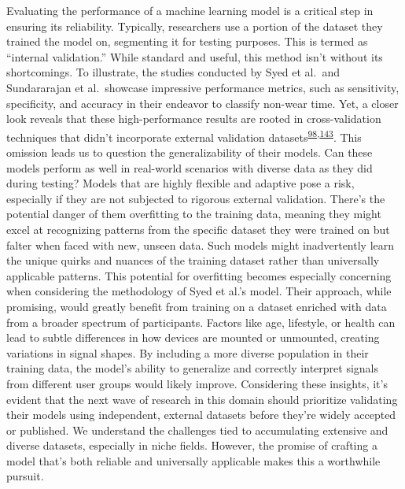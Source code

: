 \documentclass[
  10pt,
]{scrbook}
\begin{document}
Evaluating the performance of a machine learning model is a critical
step in ensuring its reliability. Typically, researchers use a portion
of the dataset they trained the model on, segmenting it for testing
purposes. This is termed as ``internal validation.'' While standard and
useful, this method isn't without its shortcomings. To illustrate, the
studies conducted by Syed et al.~and Sundararajan et al.~showcase
impressive performance metrics, such as sensitivity, specificity, and
accuracy in their endeavor to classify non-wear time. Yet, a closer look
reveals that these high-performance results are rooted in
cross-validation techniques that didn't incorporate external validation
datasets\textsuperscript{\protect\hyperlink{ref-sundararajan_sleep_2021}{98},\protect\hyperlink{ref-syed_evaluating_2020}{143}}.
This omission leads us to question the generalizability of their models.
Can these models perform as well in real-world scenarios with diverse
data as they did during testing? Models that are highly flexible and
adaptive pose a risk, especially if they are not subjected to rigorous
external validation. There's the potential danger of them overfitting to
the training data, meaning they might excel at recognizing patterns from
the specific dataset they were trained on but falter when faced with
new, unseen data. Such models might inadvertently learn the unique
quirks and nuances of the training dataset rather than universally
applicable patterns. This potential for overfitting becomes especially
concerning when considering the methodology of Syed et al.'s model.
Their approach, while promising, would greatly benefit from training on
a dataset enriched with data from a broader spectrum of participants.
Factors like age, lifestyle, or health can lead to subtle differences in
how devices are mounted or unmounted, creating variations in signal
shapes. By including a more diverse population in their training data,
the model's ability to generalize and correctly interpret signals from
different user groups would likely improve. Considering these insights,
it's evident that the next wave of research in this domain should
prioritize validating their models using independent, external datasets
before they're widely accepted or published. We understand the
challenges tied to accumulating extensive and diverse datasets,
especially in niche fields. However, the promise of crafting a model
that's both reliable and universally applicable makes this a worthwhile
pursuit.
\end{document}
